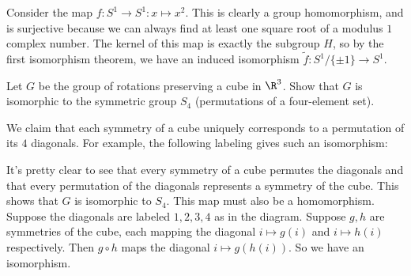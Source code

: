 \documentclass[11pt,letterpaper]{article}
\begin{document}
Consider the map $f : S^1\to S^1 : x \mapsto x^2$. This is clearly a group homomorphism, and is surjective because we can always find at least one square root of a modulus $1$ complex number. The kernel of this map is exactly the subgroup $H$, so by the first isomorphism theorem, we have an induced isomorphism $\widetilde{f} : S^1 /\{\pm 1\} \to S^1$.  

\pagebreak
\begin{problem}
  Let $G$ be the group of rotations preserving a cube in $\R^3$. Show that $G$ is isomorphic to the symmetric group $S_4$ (permutations of a four-element set).  
\end{problem}

We claim that each symmetry of a cube uniquely corresponds to a permutation of its $4$ diagonals. For example, the following labeling gives such an isomorphism:

\begin{center}
\end{center}

It's pretty clear to see that every symmetry of a cube permutes the diagonals and that every permutation of the diagonals represents a symmetry of the cube. This shows that $G$ is isomorphic to $S_4$. This map must also be a homomorphism. Suppose the diagonals are labeled $1,2,3,4$ as in the diagram. Suppose $g,h$ are symmetries of the cube, each mapping the diagonal $i\mapsto g(i)$ and $i \mapsto h(i)$ respectively. Then $g\circ h$ maps the diagonal $i\mapsto g(h(i))$. So we have an isomorphism.        
\end{document}
